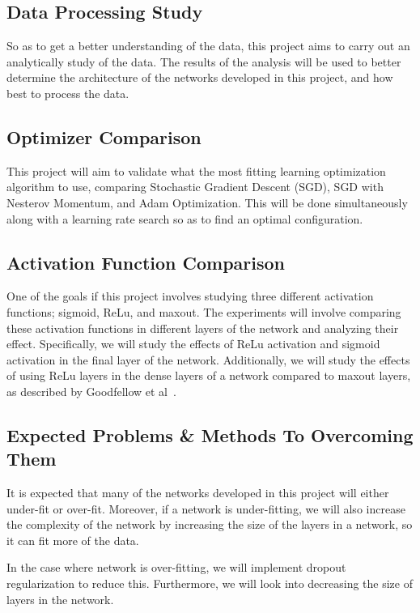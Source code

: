 \documentclass[12pt,a4paper,oneside,oldfontcommands]{memoir}
\begin{document}
\begin{Declaration Of OriginalityOrginality}
\subsection{Data Processing Study}

So as to get a better understanding of the data, this project aims to carry out an analytically study of the data. The results of the analysis will be used to better determine the architecture of the networks developed in this project, and how best to process the data. 

\subsection{Optimizer Comparison}
This project will aim to validate what the most fitting learning optimization algorithm to use, comparing Stochastic Gradient Descent (SGD), SGD with Nesterov Momentum, and Adam Optimization. This will be done simultaneously along with a learning rate search so as to find an optimal configuration. 

\subsection{Activation Function Comparison}
One of the goals if this project involves studying three different activation functions; sigmoid, ReLu, and maxout. The experiments will involve comparing these activation functions in different layers of the network and analyzing their effect. Specifically, we will study the effects of ReLu activation and sigmoid activation in the final layer of the network. Additionally, we will study the effects of using ReLu layers in the dense layers of a network compared to maxout layers, as described by Goodfellow et al~\cite{maxout}.

\subsection{Expected Problems \& Methods To Overcoming Them}
It is expected that many of the networks developed in this project will either under-fit or over-fit. Moreover, if a network is under-fitting, we will also increase the complexity of the network by increasing the size of the layers in a network, so it can fit more of the data.

In the case where network is over-fitting, we will implement dropout regularization to reduce this. Furthermore, we will look into decreasing the size of layers in the network.


\end{Declaration Of OriginalityOrginality}
\end{document}

